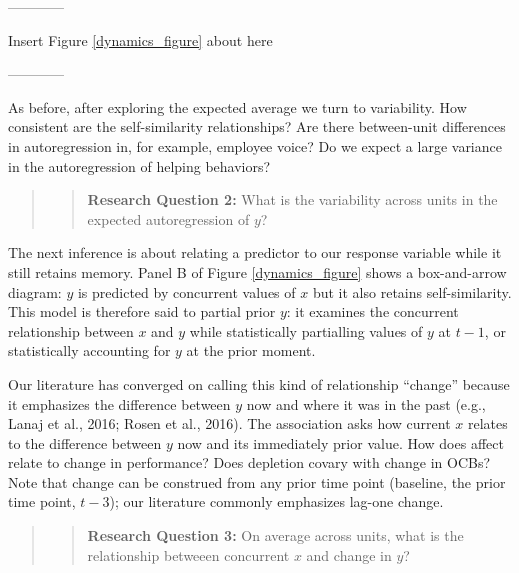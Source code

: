 \documentclass[english,,man]{apa6}
\theoremstyle{definition}
\theoremstyle{definition}
\theoremstyle{definition}
\theoremstyle{remark}
\begin{document}
\begin{center}

------------

Insert Figure \ref{dynamics_figure} about here

------------

\end{center}

As before, after exploring the expected average we turn to variability.
How consistent are the self-similarity relationships? Are there
between-unit differences in autoregression in, for example, employee
voice? Do we expect a large variance in the autoregression of helping
behaviors?

\begin{quote}
\begin{quote}
\textbf{Research Question 2:} What is the variability across units in
the expected autoregression of \(y\)?
\end{quote}
\end{quote}

The next inference is about relating a predictor to our response
variable while it still retains memory. Panel B of Figure
\ref{dynamics_figure} shows a box-and-arrow diagram: \(y\) is predicted
by concurrent values of \(x\) but it also retains self-similarity. This
model is therefore said to partial prior \(y\): it examines the
concurrent relationship between \(x\) and \(y\) while statistically
partialling values of \(y\) at \(t - 1\), or statistically accounting
for \(y\) at the prior moment.

Our literature has converged on calling this kind of relationship
\enquote{change} because it emphasizes the difference between \(y\) now
and where it was in the past (e.g., Lanaj et al., 2016; Rosen et al.,
2016). The association asks how current \(x\) relates to the difference
between \(y\) now and its immediately prior value. How does affect
relate to change in performance? Does depletion covary with change in
OCBs? Note that change can be construed from any prior time point
(baseline, the prior time point, \(t-3\)); our literature commonly
emphasizes lag-one change.

\begin{quote}
\begin{quote}
\textbf{Research Question 3:} On average across units, what is the
relationship betweeen concurrent \(x\) and change in \(y\)?
\end{quote}
\end{quote}
\end{document}
